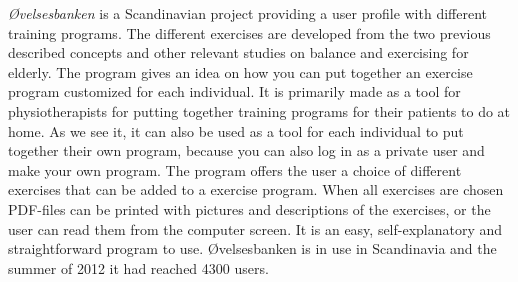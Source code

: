 \emph{{Ø}velsesbanken} is a Scandinavian project providing a user profile with different training programs. The different exercises are developed from the two previous described concepts and other relevant studies on balance and exercising for elderly. The program gives an idea on how you can put together an exercise program customized for each individual. It is primarily made as a tool for physiotherapists for putting together training programs for their patients to do at home. As we see it, it can also be used as a tool for each individual to put together their own program, because you can also log in as a private user and make your own program. The program offers the user a choice of different exercises that can be added to a exercise program. When all exercises are chosen PDF-files can be printed with pictures and descriptions of the exercises, or the user can read them from the computer screen. It is an easy, self-explanatory and straightforward program to use. {Ø}velsesbanken is in use in Scandinavia and the summer of 2012 it had reached 4300 users. \cite{ovelsesbank}\\ \\
